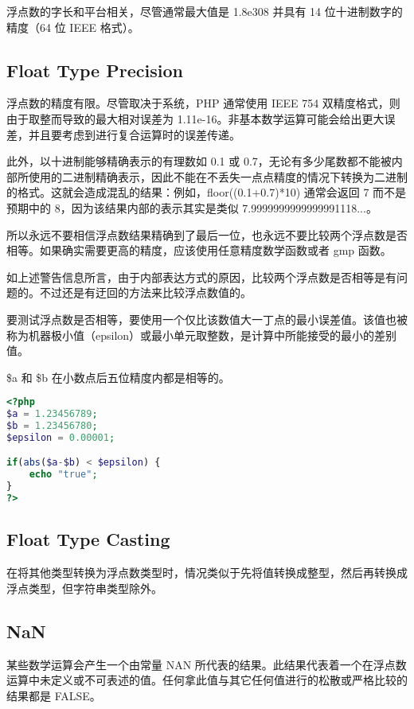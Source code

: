 浮点数的字长和平台相关，尽管通常最大值是 1.8e308 并具有 14 位十进制数字的精度（64 位 IEEE 格式）。


\subsection{Float Type Precision}


浮点数的精度有限。尽管取决于系统，PHP 通常使用 IEEE 754 双精度格式，则由于取整而导致的最大相对误差为 1.11e-16。非基本数学运算可能会给出更大误差，并且要考虑到进行复合运算时的误差传递。

此外，以十进制能够精确表示的有理数如 0.1 或 0.7，无论有多少尾数都不能被内部所使用的二进制精确表示，因此不能在不丢失一点点精度的情况下转换为二进制的格式。这就会造成混乱的结果：例如，floor((0.1+0.7)*10) 通常会返回 7 而不是预期中的 8，因为该结果内部的表示其实是类似 7.9999999999999991118...。

所以永远不要相信浮点数结果精确到了最后一位，也永远不要比较两个浮点数是否相等。如果确实需要更高的精度，应该使用任意精度数学函数或者 gmp 函数。

如上述警告信息所言，由于内部表达方式的原因，比较两个浮点数是否相等是有问题的。不过还是有迂回的方法来比较浮点数值的。

要测试浮点数是否相等，要使用一个仅比该数值大一丁点的最小误差值。该值也被称为机器极小值（epsilon）或最小单元取整数，是计算中所能接受的最小的差别值。

\$a 和 \$b 在小数点后五位精度内都是相等的。

\begin{lstlisting}[language=PHP]
<?php
$a = 1.23456789;
$b = 1.23456780;
$epsilon = 0.00001;

if(abs($a-$b) < $epsilon) {
    echo "true";
}
?>
\end{lstlisting}

\subsection{Float Type Casting}


在将其他类型转换为浮点数类型时，情况类似于先将值转换成整型，然后再转换成浮点类型，但字符串类型除外。

\subsection{NaN}

某些数学运算会产生一个由常量 NAN 所代表的结果。此结果代表着一个在浮点数运算中未定义或不可表述的值。任何拿此值与其它任何值进行的松散或严格比较的结果都是 FALSE。

